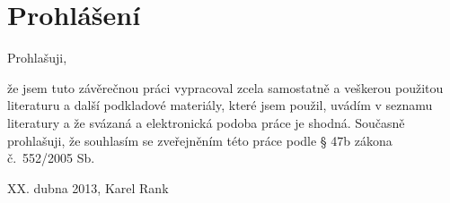 \section*{Prohlášení}
Prohlašuji,

že jsem tuto závěrečnou práci vypracoval zcela samostatně a veškerou použitou literaturu a další podkladové materiály, které jsem použil, uvádím v seznamu literatury a že svázaná a elektronická podoba práce je shodná. Současně prohlašuji, že souhlasím se zveřejněním této práce podle § 47b zákona č.~552/2005 Sb.

\bigskip
\begin{flushright}
XX. dubna 2013, Karel Rank
\end{flushright}

\newpage